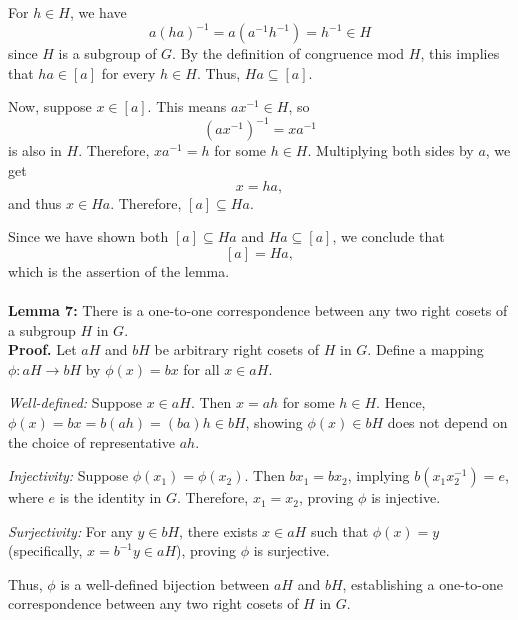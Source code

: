 For \( h \in H \), we have 
\[ a(ha)^{-1} = a(a^{-1}h^{-1}) = h^{-1} \in H \]
since \( H \) is a subgroup of \( G \). By the definition of congruence mod \( H \), this implies that \( ha \in [a] \) for every \( h \in H \). Thus, \( Ha \subseteq [a] \).

Now, suppose \( x \in [a] \). This means \( ax^{-1} \in H \), so 
\[ (ax^{-1})^{-1} = xa^{-1} \]
is also in \( H \). Therefore, \( xa^{-1} = h \) for some \( h \in H \). Multiplying both sides by \( a \), we get 
\[ x = ha, \]
and thus \( x \in Ha \). Therefore, \( [a] \subseteq Ha \).

Since we have shown both \( [a] \subseteq Ha \) and \( Ha \subseteq [a] \), we conclude that 
\[ [a] = Ha, \]
which is the assertion of the lemma.
\\\\
\textbf{Lemma 7:} There is a one-to-one correspondence between any two right cosets of a subgroup \( H \) in \( G \).
\\
\textbf{Proof.}
Let \( aH \) and \( bH \) be arbitrary right cosets of \( H \) in \( G \). Define a mapping \( \phi: aH \to bH \) by \( \phi(x) = bx \) for all \( x \in aH \).

\textit{Well-defined:} Suppose \( x \in aH \). Then \( x = ah \) for some \( h \in H \). Hence, \( \phi(x) = bx = b(ah) = (ba)h \in bH \), showing \( \phi(x) \in bH \) does not depend on the choice of representative \( ah \).

\textit{Injectivity:} Suppose \( \phi(x_1) = \phi(x_2) \). Then \( bx_1 = bx_2 \), implying \( b(x_1 x_2^{-1}) = e \), where \( e \) is the identity in \( G \). Therefore, \( x_1 = x_2 \), proving \( \phi \) is injective.

\textit{Surjectivity:} For any \( y \in bH \), there exists \( x \in aH \) such that \( \phi(x) = y \) (specifically, \( x = b^{-1}y \in aH \)), proving \( \phi \) is surjective.

Thus, \( \phi \) is a well-defined bijection between \( aH \) and \( bH \), establishing a one-to-one correspondence between any two right cosets of \( H \) in \( G \).


